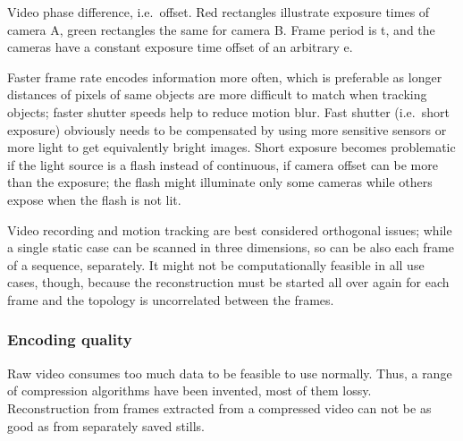 
{Video phase difference, i.e.~offset.
Red rectangles illustrate exposure times of camera A, green rectangles the same for camera B.
Frame period is t, and the cameras have a constant exposure time offset of an arbitrary e.}

Faster frame rate encodes information more often, which is preferable as longer distances of pixels of same objects are more difficult to match when tracking objects; faster shutter speeds help to reduce motion blur.
Fast shutter (i.e.~short exposure) obviously needs to be compensated by using more sensitive sensors or more light to get equivalently bright images.
Short exposure becomes problematic if the light source is a flash instead of continuous, if camera offset can be more than the exposure; the flash might illuminate only some cameras while others expose when the flash is not lit.

Video recording and motion tracking are best considered orthogonal issues; while a single static case can be scanned in three dimensions, so can be also each frame of a sequence, separately.
It might not be computationally feasible in all use cases, though, because the reconstruction must be started all over again for each frame and the topology is uncorrelated between the frames.



\subsubsection{Encoding quality} %

Raw video consumes too much data to be feasible to use normally.
Thus, a range of compression algorithms have been invented, most of them lossy.
Reconstruction from frames extracted from a compressed video can not be as good as from separately saved stills.

